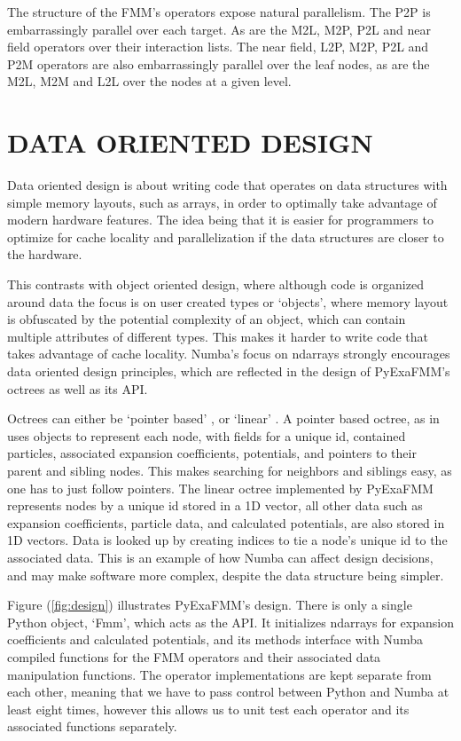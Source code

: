 \documentclass{IEEEcsmag}
\begin{document}
The structure of the FMM's operators expose natural parallelism. The P2P is embarrassingly parallel over each target. As are the M2L, M2P, P2L and near field operators over their interaction lists. The near field, L2P, M2P, P2L and P2M operators are also embarrassingly parallel over the leaf nodes, as are the M2L, M2M and L2L over the nodes at a given level.

\section{DATA ORIENTED DESIGN}

Data oriented design is about writing code that operates on data structures with simple memory layouts, such as arrays, in order to optimally take advantage of modern hardware features. The idea being that it is easier for programmers to optimize for cache locality and parallelization if the data structures are closer to the hardware.

This contrasts with object oriented design, where although code is organized around data the focus is on user created types or `objects', where memory layout is obfuscated by the potential complexity of an object, which can contain multiple attributes of different types. This makes it harder to write code that takes advantage of cache locality. Numba's focus on ndarrays strongly encourages data oriented design principles, which are reflected in the design of PyExaFMM's octrees as well as its API.

Octrees can either be `pointer based' \cite{Wang2021}, or `linear' \cite{Sundar2007}. A pointer based octree, as in uses objects to represent each node, with fields for a unique id, contained particles, associated expansion coefficients, potentials, and pointers to their parent and sibling nodes. This makes searching for neighbors and siblings easy, as one has to just follow pointers. The linear octree implemented by PyExaFMM represents nodes by a unique id stored in a 1D vector, all other data such as expansion coefficients, particle data, and calculated potentials, are also stored in 1D vectors. Data is looked up by creating indices to tie a node's unique id to the associated data. This is an example of how Numba can affect design decisions, and may make software more complex, despite the data structure being simpler.

Figure (\ref{fig:design}) illustrates PyExaFMM's design. There is only a single Python object, `Fmm', which acts as the API. It initializes ndarrays for expansion coefficients and calculated potentials, and its methods interface with Numba compiled functions for the FMM operators and their associated data manipulation functions. The operator implementations are kept separate from each other, meaning that we have to pass control between Python and Numba at least eight times, however this allows us to unit test each operator and its associated functions separately.
\end{document}
